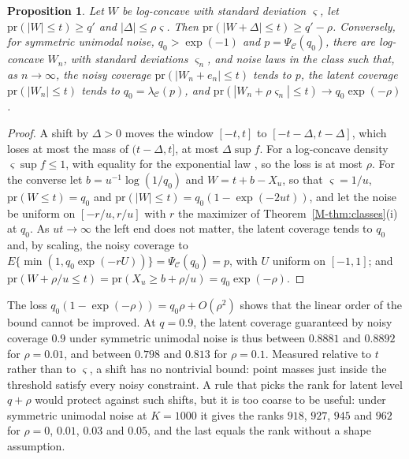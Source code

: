 \documentclass[12pt]{article}
\renewcommand{\_}{\usc\allowbreak}
\newtheorem{proposition}{Proposition}
\theoremstyle{definition}
\numberwithin{equation}{section}
\newcommand{\pr}{\mathrm{pr}}
\newcommand{\E}{\mathcal{C}}
\begin{document}
\begin{proposition}\label{prop:shift}
Let $W$ be log-concave with standard deviation $\varsigma$, let $\pr(|W| \le t) \ge q'$ and $|\Delta| \le \rho\varsigma$. Then $\pr(|W + \Delta| \le t) \ge q' - \rho$. Conversely, for symmetric unimodal noise, $q_0 > \exp(-1)$ and $p = \Psi_{\E}(q_0)$, there are log-concave $W_n$, with standard deviations $\varsigma_n$, and noise laws in the class such that, as $n \to \infty$, the noisy coverage $\pr(|W_n + e_n| \le t)$ tends to $p$, the latent coverage $\pr(|W_n| \le t)$ tends to $q_0 = \lambda_{\E}(p)$, and $\pr(|W_n + \rho\varsigma_n| \le t) \to q_0\exp(-\rho)$.
\end{proposition}

\begin{proof}
A shift by $\Delta > 0$ moves the window $[-t, t]$ to $[-t - \Delta, t - \Delta]$, which loses at most the mass of $(t - \Delta, t]$, at most $\Delta\sup f$. For a log-concave density $\varsigma\sup f \le 1$, with equality for the exponential law \citep{bobkov2015}, so the loss is at most $\rho$. For the converse let $b = u^{-1}\log(1/q_0)$ and $W = t + b - X_u$, so that $\varsigma = 1/u$, $\pr(W \le t) = q_0$ and $\pr(|W| \le t) = q_0(1 - \exp(-2ut))$, and let the noise be uniform on $[-r/u, r/u]$ with $r$ the maximizer of Theorem~\ref{M-thm:classes}(i) at $q_0$. As $ut \to \infty$ the left end does not matter, the latent coverage tends to $q_0$ and, by scaling, the noisy coverage to $E\{\min(1, q_0\exp(-rU))\} = \Psi_{\E}(q_0) = p$, with $U$ uniform on $[-1, 1]$; and $\pr(W + \rho/u \le t) = \pr(X_u \ge b + \rho/u) = q_0\exp(-\rho)$.
\end{proof}

The loss $q_0(1 - \exp(-\rho)) = q_0\rho + O(\rho^2)$ shows that the linear order of the bound cannot be improved. At $q = 0.9$, the latent coverage guaranteed by noisy coverage $0.9$ under symmetric unimodal noise is thus between $0.8881$ and $0.8892$ for $\rho = 0.01$, and between $0.798$ and $0.813$ for $\rho = 0.1$. Measured relative to $t$ rather than to $\varsigma$, a shift has no nontrivial bound: point masses just inside the threshold satisfy every noisy constraint. A rule that picks the rank for latent level $q + \rho$ would protect against such shifts, but it is too coarse to be useful: under symmetric unimodal noise at $K = 1000$ it gives the ranks $918$, $927$, $945$ and $962$ for $\rho = 0$, $0.01$, $0.03$ and $0.05$, and the last equals the rank without a shape assumption.

\end{document}
